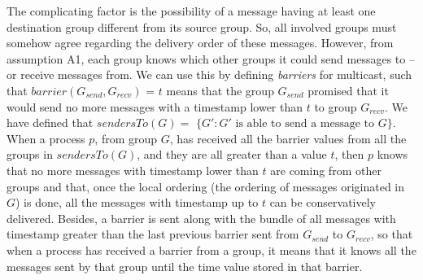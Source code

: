 \documentclass[times, 10pt]{article}
\begin{document}

The complicating factor is the possibility of a message having at least one destination group different from its source group. So, all involved groups must somehow agree regarding the delivery order of these messages. However, from assumption A1, each group knows which other groups it could send messages to -- or receive messages from. We can use this by defining \emph{barriers} for multicast, such that $barrier(G_{send},G_{recv})$ = $t$ means that the group $G_{send}$ promised that it would send no more messages with a timestamp lower than $t$ to group $G_{recv}$. We have defined that $sendersTo(G) =$ \mbox{$\{G' : G'\text{ is able to send a message to }G\}$}. When a process $p$, from group $G$, has received all the barrier values from all the groups in $sendersTo(G)$, and they are all greater than a value $t$, then $p$ knows that no more messages with timestamp lower than $t$ are coming from other groups and that, once the local ordering (the ordering of messages originated in $G$) is done, all the messages with timestamp up to $t$ can be conservatively delivered. Besides, a barrier is sent along with the bundle of all messages with timestamp greater than the last previous barrier sent from $G_{send}$ to $G_{recv}$, so that when a process has received a barrier from a group, it means that it knows all the messages sent by that group until the time value stored in that barrier. 
\end{document}
